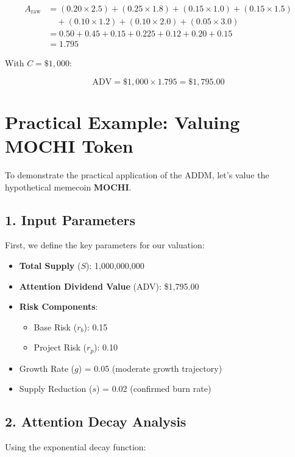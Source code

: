 \documentclass[a4paper,12pt]{article}
\begin{document}
\[
\begin{align*}
A_{\text{raw}} &= (0.20 \times 2.5) + (0.25 \times 1.8) + (0.15 \times 1.0) + (0.15 \times 1.5) \\
&\quad + (0.10 \times 1.2) + (0.10 \times 2.0) + (0.05 \times 3.0) \\
&= 0.50 + 0.45 + 0.15 + 0.225 + 0.12 + 0.20 + 0.15 \\
&= 1.795
\end{align*}
\]

With \( C = \$1,000 \):

\[
\text{ADV} = \$1,000 \times 1.795 = \$1,795.00
\]

\section*{Practical Example: Valuing MOCHI Token}
To demonstrate the practical application of the ADDM, let's value the hypothetical memecoin \textbf{MOCHI}.

\subsection*{1. Input Parameters}
First, we define the key parameters for our valuation:

\begin{itemize}
    \item \textbf{Total Supply} (\(S\)): 1,000,000,000 
    \item \textbf{Attention Dividend Value} (\(\text{ADV}\)): \$1,795.00
    \item \textbf{Risk Components}:
    \begin{itemize}
        \item Base Risk (\(r_b\)): 0.15 
        \item Project Risk (\(r_p\)): 0.10 
    \end{itemize}
    \item Growth Rate (\(g\)) = 0.05 (moderate growth trajectory)
    \item Supply Reduction (\(s\)) = 0.02 (confirmed burn rate)
\end{itemize}

\subsection*{2. Attention Decay Analysis}
Using the exponential decay function:
\end{document}

